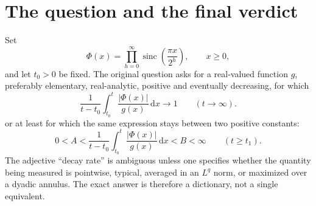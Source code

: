 \documentclass[11pt]{article}
\theoremstyle{definition}
\theoremstyle{remark}
\newcommand{\dd}{\,\mathrm d}
\newcommand{\sinc}{\operatorname{sinc}}
\newcommand{\bigO}{\mathcal O}
\begin{document}
\begin{abstract}
Finally, for the actual largest value
\(M_k=\max_{2^k\le x\le2^{k+1}}|\Phi(x)|\), we verify the sharp boundary-layer
formula
\[
 \begin{aligned}
 \log M_k={}&-\frac{\log2}{2}k(k+1)-(k+1)\log\pi
 +(k+1)\log\frac{\sqrt3}{2}\\
 &-\frac{W(c(k+1))^2+2W(c(k+1))}{2\log2}
 +\bigO((\log\log k)^2),
 \end{aligned}
\]
where \(c=(\log2)\sqrt{3/2}/\pi\).  This includes a second log-normal
suppression in \(\log\log x\), and is distinct from every fixed-ray or mean
law.
\end{abstract}

\begingroup
\footnotesize
\tableofcontents
\endgroup
\newpage

\section{The question and the final verdict}

Set
\begin{equation}
 \Phi(x)=\prod_{h=0}^{\infty}
 \sinc\!\left(\frac{\pi x}{2^h}\right),
 \qquad x\ge0,
 \label{eq:Phi-def}
\end{equation}
and let \(t_0>0\) be fixed.  The original question asks for a real-valued
function \(g\), preferably elementary, real-analytic, positive and eventually
decreasing, for which\cite{mse-question,question-source}
\begin{equation*}
 \frac1{t-t_0}\int_{t_0}^{t}\frac{|\Phi(x)|}{g(x)}\dd x\longrightarrow1
 \qquad(t\to\infty).
 \tag{C}
\end{equation*}
or at least for which the same expression stays between two positive constants:
\begin{equation*}
 0<A<\frac1{t-t_0}\int_{t_0}^{t}\frac{|\Phi(x)|}{g(x)}\dd x<B<\infty
 \qquad(t\ge t_1).
 \tag{B}
\end{equation*}
The adjective ``decay rate'' is ambiguous unless one specifies whether the
quantity being measured is pointwise, typical, averaged in an \(L^q\) norm, or
maximized over a dyadic annulus.  The exact answer is therefore a dictionary,
not a single equivalent.
\end{document}
